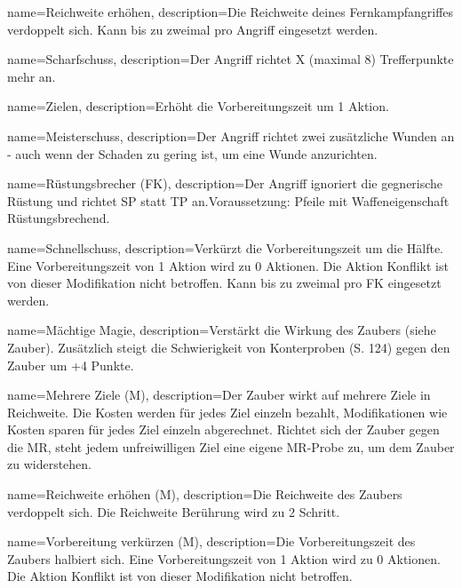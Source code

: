 {
    name={Reichweite erhöhen},
    description={Die Reichweite deines Fernkampfangriffes verdoppelt sich. Kann bis zu zweimal pro Angriff eingesetzt werden.}
}


{
    name={Scharfschuss},
    description={Der Angriff richtet X (maximal 8) Trefferpunkte mehr an.}
}


{
    name={Zielen},
    description={Erhöht die Vorbereitungszeit um 1 Aktion.}
}


{
    name={Meisterschuss},
    description={Der Angriff richtet zwei zusätzliche Wunden an - auch wenn der Schaden zu gering ist, um eine Wunde anzurichten.}
}


{
    name={Rüstungsbrecher (FK)},
    description={Der Angriff ignoriert die gegnerische Rüstung und richtet SP statt TP an.\newline Voraussetzung: Pfeile mit Waffeneigenschaft Rüstungsbrechend.}
}


{
    name={Schnellschuss},
    description={Verkürzt die Vorbereitungszeit um die Hälfte. Eine Vorbereitungszeit von 1 Aktion wird zu 0 Aktionen. Die Aktion Konflikt ist von dieser Modifikation nicht betroffen. Kann bis zu zweimal pro FK eingesetzt werden.}
}


{
    name={Mächtige Magie},
    description={Verstärkt die Wirkung des Zaubers (siehe Zauber). Zusätzlich steigt die Schwierigkeit von Konterproben (S. 124) gegen den Zauber um +4 Punkte.}
}


{
    name={Mehrere Ziele (M)},
    description={Der Zauber wirkt auf mehrere Ziele in Reichweite. Die Kosten werden für jedes Ziel einzeln bezahlt, Modifikationen wie Kosten sparen für jedes Ziel einzeln abgerechnet. Richtet sich der Zauber gegen die MR, steht jedem unfreiwilligen Ziel eine eigene MR-Probe zu, um dem Zauber zu widerstehen.}
}


{
    name={Reichweite erhöhen (M)},
    description={Die Reichweite des Zaubers verdoppelt sich. Die Reichweite Berührung wird zu 2 Schritt.}
}


{
    name={Vorbereitung verkürzen (M)},
    description={Die Vorbereitungszeit des Zaubers halbiert sich. Eine Vorbereitungszeit von 1 Aktion wird zu 0 Aktionen. Die Aktion Konflikt ist von dieser Modifikation nicht betroffen.}
}


